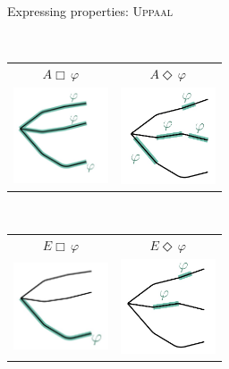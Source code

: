 \documentclass[aspectratio=169]{beamer}
\begin{document}
\begin{slide}{Expressing properties: \textsc{Uppaal}}
\small \centering

~\\
\begin{tabular}{cc}
  \Large $A \Box\, \varphi$ & \Large $A \Diamond \, \varphi$ \\
 \includegraphics[width=2.8cm]{./images/AA.jpg} &
 \hspace{1cm} \includegraphics[width=2.8cm]{./images/AE.jpg}
\end{tabular}

~\\[2mm]

\begin{tabular}{cc}
  \Large $E \Box\, \varphi$ & \Large $E \Diamond\, \varphi$ \\
 \includegraphics[width=2.8cm]{./images/EA.jpg} &   \hspace{1cm} \includegraphics[width=2.8cm]{./images/EE.jpg}
\end{tabular}
\end{slide}
\end{document}
